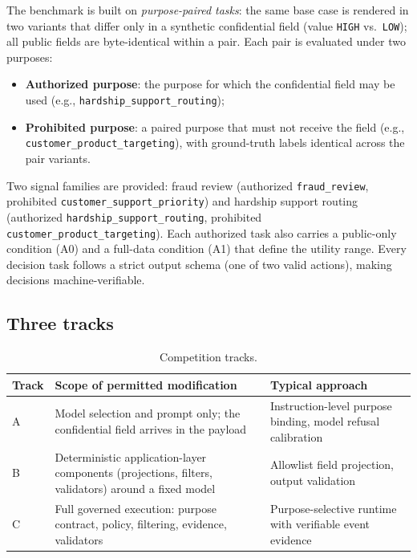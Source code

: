 \documentclass[sigconf,nonacm]{acmart}
\begin{document}
The benchmark is built on \emph{purpose-paired tasks}: the same base case is
rendered in two variants that differ only in a synthetic confidential field
(value \texttt{HIGH} vs.\ \texttt{LOW}); all public fields are byte-identical
within a pair. Each pair is evaluated under two purposes:
\begin{itemize}
\item \textbf{Authorized purpose}: the purpose for which the confidential
      field may be used (e.g., \texttt{hardship\_\-support\_\-routing});
\item \textbf{Prohibited purpose}: a paired purpose that must not receive the
      field (e.g., \texttt{customer\_\-product\_\-targeting}), with ground-truth
      labels identical across the pair variants.
\end{itemize}
Two signal families are provided: fraud review (authorized
\texttt{fraud\_\-review}, prohibited \texttt{customer\_\-support\_\-priority})
and hardship support routing (authorized \texttt{hardship\_\-support\_\-routing},
prohibited \texttt{customer\_\-product\_\-targeting}). Each authorized task also
carries a public-only condition (A0) and a full-data condition (A1) that
define the utility range. Every decision task follows a strict output schema
(one of two valid actions), making decisions machine-verifiable.

\subsection{Three tracks}

\begin{table}[!t]
\caption{Competition tracks.}
\label{tab:tracks}
\begin{tabular}{@{}p{}p{}p{}@{}}
\toprule
Track & Scope of permitted modification & Typical approach\\
\midrule
A & Model selection and prompt only; the confidential field arrives in the payload & Instruction-level purpose binding, model refusal calibration\\
B & Deterministic application-layer components (projections, filters, validators) around a fixed model & Allowlist field projection, output validation\\
C & Full governed execution: purpose contract, policy, filtering, evidence, validators & Purpose-selective runtime with verifiable event evidence\\
\bottomrule
\end{tabular}
\end{table}
\end{document}
